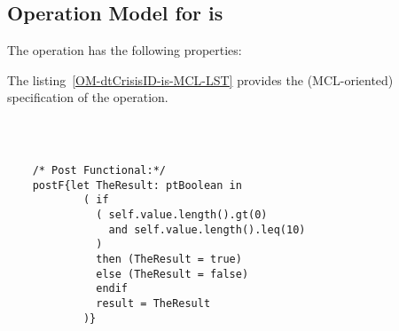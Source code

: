 \subsection{Operation Model for is}

\label{OM-is}


The  operation has the following properties:

	\begin{operationmodel}



		


	\end{operationmodel}



	\vspace{1cm}
	The listing~\ref{OM-dtCrisisID-is-MCL-LST} provides the \msrmessir (MCL-oriented) specification of the operation.
	
	\scriptsize
	\vspace{0.5cm}
	\begin{lstlisting}[style=MessirStyle,firstnumber=auto,captionpos=b,caption={\msrmessir (MCL-oriented) specification of the operation \emph{is}.},label=OM-dtCrisisID-is-MCL-LST]

	
	
	/* Post Functional:*/ 
	postF{let TheResult: ptBoolean in
	        ( if
	          ( self.value.length().gt(0)
	            and self.value.length().leq(10)
	          )
	          then (TheResult = true)
	          else (TheResult = false)
	          endif
	          result = TheResult
	        )}
	
	
	\end{lstlisting}
	\normalsize 
	
	
	
	





